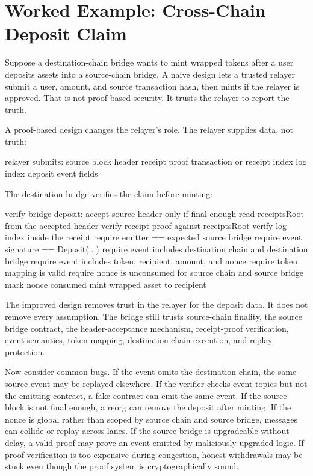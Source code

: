 \section{Worked Example: Cross-Chain Deposit Claim}

Suppose a destination-chain bridge wants to mint wrapped tokens after a user deposits assets into a source-chain bridge. A naive design lets a trusted relayer submit a user, amount, and source transaction hash, then mints if the relayer is approved. That is not proof-based security. It trusts the relayer to report the truth.

A proof-based design changes the relayer's role. The relayer supplies data, not truth:

\begin{codeblock}
relayer submits:
    source block header
    receipt proof
    transaction or receipt index
    log index
    deposit event fields
\end{codeblock}

The destination bridge verifies the claim before minting:

\begin{codeblock}
verify bridge deposit:
    accept source header only if final enough
    read receiptsRoot from the accepted header
    verify receipt proof against receiptsRoot
    verify log index inside the receipt
    require emitter == expected source bridge
    require event signature == Deposit(...)
    require event includes destination chain and destination bridge
    require event includes token, recipient, amount, and nonce
    require token mapping is valid
    require nonce is unconsumed for source chain and source bridge
    mark nonce consumed
    mint wrapped asset to recipient
\end{codeblock}

The improved design removes trust in the relayer for the deposit data. It does not remove every assumption. The bridge still trusts source-chain finality, the source bridge contract, the header-acceptance mechanism, receipt-proof verification, event semantics, token mapping, destination-chain execution, and replay protection.

Now consider common bugs. If the event omits the destination chain, the same source event may be replayed elsewhere. If the verifier checks event topics but not the emitting contract, a fake contract can emit the same event. If the source block is not final enough, a reorg can remove the deposit after minting. If the nonce is global rather than scoped by source chain and source bridge, messages can collide or replay across lanes. If the source bridge is upgradeable without delay, a valid proof may prove an event emitted by maliciously upgraded logic. If proof verification is too expensive during congestion, honest withdrawals may be stuck even though the proof system is cryptographically sound.

